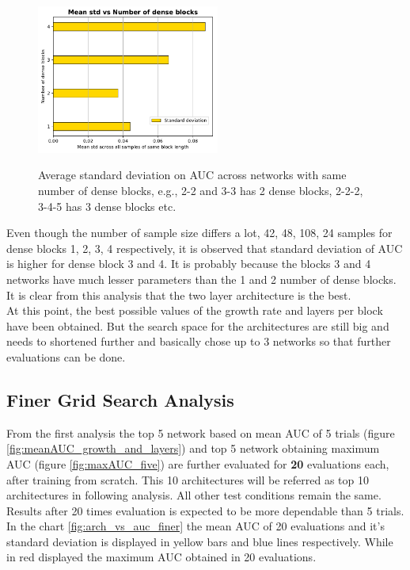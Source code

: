 \begin{figure}[ht]
\centering
\includegraphics[width=6cm]{images/densenet/siamese/densenet_siamese_std_blocks_bar}
\label{std_dense_blocks}
\caption{Average standard deviation on AUC across networks with same number of dense blocks, e.g., 2-2 and 3-3 has 2 dense blocks, 2-2-2, 3-4-5 has 3 dense blocks etc.}
\end{figure}

Even though the number of sample size differs a lot, 42, 48, 108, 24 samples for dense blocks 1, 2, 3, 4 respectively, it is observed that standard deviation of AUC is higher for dense block 3 and 4.
It is probably because the blocks 3 and 4 networks have much lesser parameters than the 1 and 2 number of dense blocks. It is clear from this analysis that the two layer architecture is the best.\\

At this point, the best possible values of the growth rate and layers per block have been obtained. But the search space for the architectures are still big and needs to shortened further and basically chose up to 3 networks so that further 
evaluations can be done. 

\subsection{Finer Grid Search Analysis}
From the first analysis the top 5 network based on mean AUC of 5 trials (figure \ref{fig:meanAUC_growth_and_layers}) and top 5 network obtaining maximum AUC (figure \ref{fig:maxAUC_five}) are further evaluated for \textbf{20} 
evaluations each, after training from scratch. This 10 architectures will be referred as top 10 architectures in following analysis. All other test conditions remain the same. Results after 20 times evaluation is expected to 
be more dependable than 5 trials. In the chart \ref{fig:arch_vs_auc_finer} the mean AUC of 20 evaluations and it's standard deviation is displayed in yellow bars and blue lines respectively. 
While in red displayed the maximum AUC obtained in 20 evaluations.

